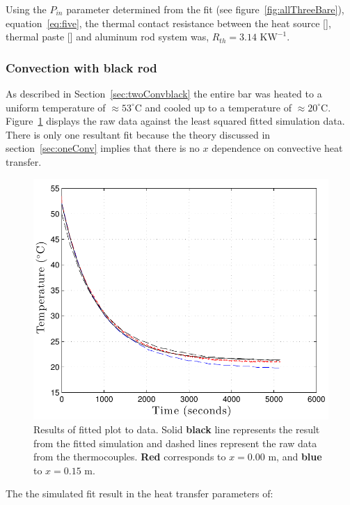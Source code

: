 \documentclass[10pt,aps,prb,twocolumn, nofootinbib]{revtex4-1}
\begin{document}
Using the $P_{in}$ parameter determined from the fit (see figure~\ref{fig:allThreeBare}), equation~\ref{eq:five}, the thermal contact resistance between the heat source [], thermal paste [] and aluminum rod system was, $\boxed{R_{th} = 3.14 \text{ K}\text{W}^{-1}}$.


\subsubsection{\label{sec:threeConvblack} Convection with black rod}
As described in Section~\ref{sec:twoConvblack} the entire bar was heated to a uniform temperature of $\approx 53^\circ \text{C}$ and cooled up to a temperature of $\approx 20^\circ \text{C}$. Figure~\ref{fig:blackCooling} displays the raw data against the least squared fitted simulation data. There is only one resultant fit because the theory discussed in section~\ref{sec:oneConv} implies that there is no $x$ dependence on convective heat transfer.   

\begin{figure}[h]
\centering
\includegraphics[width=1.0\linewidth]{blackCooling}
\caption{Results of fitted plot to data. Solid \textbf{black} line represents the result from the fitted simulation and dashed lines represent the raw data from the thermocouples. {\color{red}\textbf{Red}} corresponds to $x = 0.00$ m, and {\color{blue}\textbf{blue}} to $x = 0.15$ m.}
\label{fig:blackCooling}
\end{figure}
The the simulated fit result in the heat transfer parameters of:
\begin{center}
\end{center}
\end{document}
